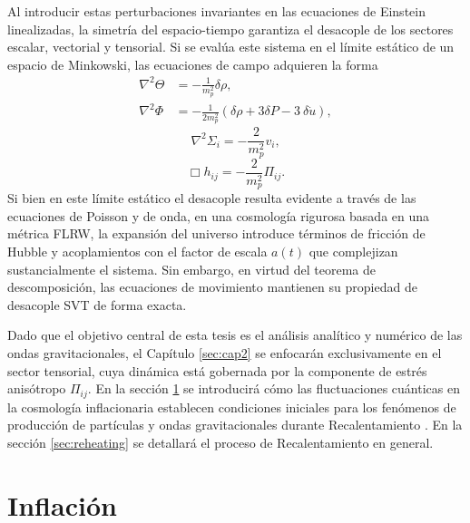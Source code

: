 Al introducir estas perturbaciones invariantes en las ecuaciones de Einstein linealizadas, la simetría del espacio-tiempo garantiza el desacople de los sectores escalar, vectorial y tensorial. Si se evalúa este sistema en el límite estático de un espacio de Minkowski, las ecuaciones de campo adquieren la forma
\vspace{-0.25cm}
\begin{equation}
    \begin{aligned}
        \nabla^2 \Theta &= - \frac{1}{m^2_p} \delta\rho, \\
        \nabla^2 \Phi &= - \frac{1}{2 m_p^2} \left( \delta\rho + 3 \delta P - 3 ~ \delta \dot{u} \right),
    \end{aligned}
\end{equation}
\begin{equation}
    \nabla^2 \Sigma_i = - \frac{2}{m^2_p} v_i,
\end{equation}
\begin{equation}\label{eqn:Perturbacion_Tensorial}
    \Box h_{ij} = - \frac{2}{m_p^2} \Pi_{ij}.
\end{equation} 
Si bien en este límite estático el desacople resulta evidente a través de las ecuaciones de Poisson y de onda, en una cosmología rigurosa basada en una métrica FLRW, la expansión del universo introduce términos de fricción de Hubble y acoplamientos con el factor de escala $a(t)$ que complejizan sustancialmente el sistema. Sin embargo, en virtud del teorema de descomposición, las ecuaciones de movimiento mantienen su propiedad de desacople SVT de forma exacta.

Dado que el objetivo central de esta tesis es el análisis analítico y numérico de las ondas gravitacionales, el Capítulo \ref{sec:cap2} se enfocarán exclusivamente en el sector tensorial, cuya dinámica está gobernada por la componente de estrés anisótropo $\Pi_{ij}$. En la sección \ref{sec:inflacion} se introducirá cómo las fluctuaciones cuánticas en la cosmología inflacionaria establecen condiciones iniciales para los fenómenos de producción de partículas y ondas gravitacionales durante Recalentamiento \cite{Baumann_2012, Mishra_2024}. En la sección \ref{sec:reheating} se detallará el proceso de Recalentamiento en general. 

\section{Inflación}\label{sec:inflacion}

